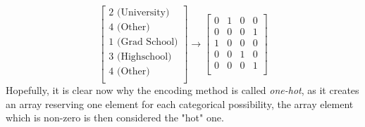             \begin{equation}
                \begin{bmatrix}
                \text{2 (University)}\\
                \text{4 (Other)}\\
                \text{1 (Grad School)}\\
                \text{3 (Highschool)}\\
                \text{4 (Other)}\\
                \end{bmatrix}
                \rightarrow
                \begin{bmatrix}
                0 & 1 & 0 & 0 \\
                0 & 0 & 0 & 1\\
                1 & 0 & 0 & 0\\
                0 & 0 & 1 & 0\\
                0 & 0 & 0 & 1\\
                \end{bmatrix}
            \end{equation}
            Hopefully, it is clear now why the encoding method is called \textit{one-hot}, as it creates an array reserving one element for each categorical possibility, the array element which is non-zero is then considered the "hot" one.
